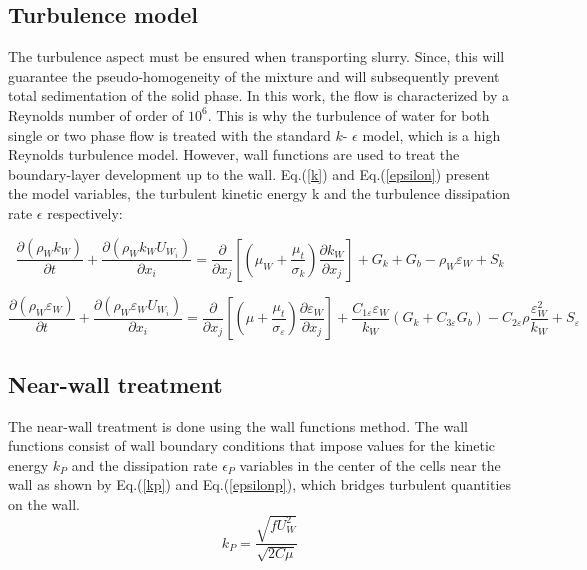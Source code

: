 \documentclass[review,3p,times,12pt]{elsarticle}
\begin{document}
\subsection{Turbulence model }

The turbulence aspect must be ensured when transporting slurry. Since, this will guarantee the pseudo-homogeneity of the mixture and will subsequently prevent total sedimentation of the solid phase. In this work, the flow is characterized by a Reynolds number of order of $10^6$. This is why the turbulence of water for both single or two phase flow is treated with the standard $k$- $\epsilon$ model, which is a high Reynolds turbulence model. However, wall functions are used to treat the boundary-layer development up to the wall. Eq.(\ref{k}) and Eq.(\ref{epsilon}) present the model variables, the turbulent kinetic energy k and the turbulence dissipation rate $\epsilon$ respectively:

\begin{equation}
\frac{\partial(\rho_W k_W)}{\partial t}+\frac{\partial\left(\rho_W k_W U_{W_i}\right)}{\partial x_{i}}=\frac{\partial}{\partial x_{j}}\left[\left(\mu_W+\frac{\mu_{t}}{\sigma_{k}}\right) \frac{\partial k_W}{\partial x_{j}}\right]+G_{k}+G_{b}-\rho_W \varepsilon_W+S_{k}
\label{k}
\end{equation}

\begin{equation}
\frac{\partial(\rho_W \varepsilon_W)}{\partial t}+\frac{\partial\left(\rho_W \varepsilon_W U_{W_i}\right)}{\partial x_{i}}=\frac{\partial}{\partial x_{j}}\left[\left(\mu+\frac{\mu_{t}}{\sigma_{\varepsilon}}\right) \frac{\partial \varepsilon_W}{\partial x_{j}}\right]+\frac{C_{1 \varepsilon} \varepsilon_W}{k_W}\left(G_{k}+C_{3 \varepsilon} G_{b}\right)-C_{2 \varepsilon} \rho \frac{\varepsilon_{W}^{2}}{k_W}+S_{\varepsilon}
\label{epsilon}
\end{equation}

\subsection{Near-wall treatment} \label{NWT}

The near-wall treatment is done using the wall functions method. The wall functions consist of wall boundary conditions that impose values for the kinetic energy $k_{P}$ and the dissipation rate $\epsilon_{P}$ variables in the center of the cells near the wall as shown by Eq.(\ref{kp}) and Eq.(\ref{epsilonp}), which bridges turbulent quantities on the wall.
\begin{equation}
k_{P} =\frac{\sqrt{f {U_{W}^2 }}}{\sqrt{2 C\mu }}
\label{kp}
\end{equation}
\end{document}
